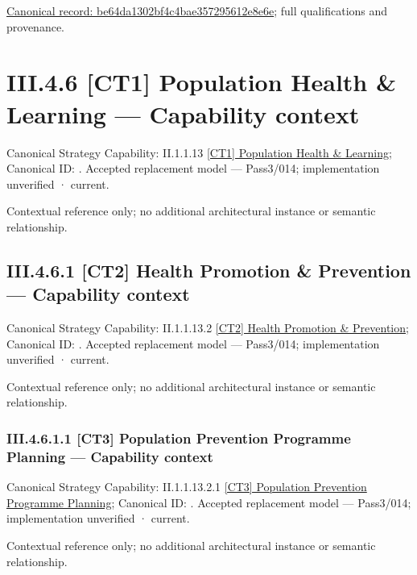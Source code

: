 {\footnotesize \href{../../../../../../../../continuum/business/business-function/be64da1302bf4c4bae357295612e8e6e.md}{Canonical record: be64da1302bf4c4bae357295612e8e6e}; full qualifications and provenance.}\par
\section*{III.4.6 [CT1] Population Health \& Learning — Capability context}
\label{navigation:III.4.6}

{\small Canonical Strategy Capability: II.1.1.13 \hyperref[element:171474082c704543b2e57fe37c9797ec]{[CT1] Population Health \& Learning}; Canonical ID: \texttt{}. Accepted replacement model — Pass3/014; implementation unverified · current.}\par
Contextual reference only; no additional architectural instance or semantic relationship.\par
\subsection*{III.4.6.1 [CT2] Health Promotion \& Prevention — Capability context}
\label{navigation:III.4.6.1}

{\small Canonical Strategy Capability: II.1.1.13.2 \hyperref[element:b0100053f6174e2b86e15c545a2fd4d0]{[CT2] Health Promotion \& Prevention}; Canonical ID: \texttt{}. Accepted replacement model — Pass3/014; implementation unverified · current.}\par
Contextual reference only; no additional architectural instance or semantic relationship.\par
\subsubsection*{III.4.6.1.1 [CT3] Population Prevention Programme Planning — Capability context}
\label{navigation:III.4.6.1.1}

{\small Canonical Strategy Capability: II.1.1.13.2.1 \hyperref[element:5e440d45f96e47a29981efa4e7153a9d]{[CT3] Population Prevention Programme Planning}; Canonical ID: \texttt{}. Accepted replacement model — Pass3/014; implementation unverified · current.}\par
Contextual reference only; no additional architectural instance or semantic relationship.\par
